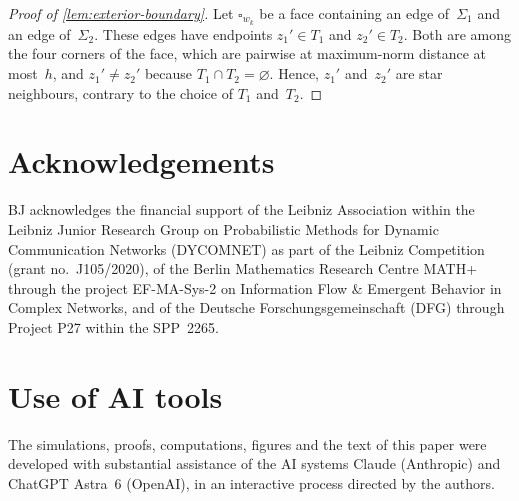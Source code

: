 \documentclass[11pt,letterpaper]{article}
\begin{document}
\begin{proof}[Proof of \cref{lem:exterior-boundary}]
Let $\square_{w_k}$ be a face containing an edge of~$\Sigma_1$ and an edge of~$\Sigma_2$. These edges have endpoints $z_1'\in T_1$ and $z_2'\in T_2$. Both are among the four corners of the face, which are pairwise at maximum-norm distance at most~$h$, and $z_1'\neq z_2'$ because $T_1\cap T_2=\varnothing$. Hence, $z_1'$ and~$z_2'$ are star neighbours, contrary to the choice of $T_1$ and~$T_2$.
\end{proof}

\section*{Acknowledgements}

BJ acknowledges the financial support of the Leibniz Association within the Leibniz Junior Research Group on Probabilistic Methods for Dynamic Communication Networks (DYCOMNET) as part of the Leibniz Competition (grant no.~J105/2020), of the Berlin Mathematics Research Centre MATH+ through the project EF-MA-Sys-2 on Information Flow \& Emergent Behavior in Complex Networks, and of the Deutsche Forschungsgemeinschaft (DFG) through Project P27 within the SPP~2265.

\section*{Use of AI tools}

The simulations, proofs, computations, figures and the text of this paper were developed with substantial assistance of the AI systems Claude (Anthropic) and ChatGPT Astra~6 (OpenAI), in an interactive process directed by the authors.


{\small}
\end{document}
